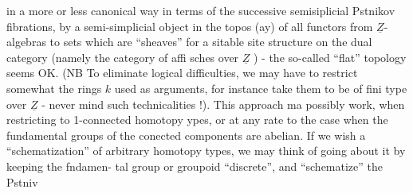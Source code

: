 in a more or less canonical way in terms of the successive semisiplicial
Pstnikov fibrations, by a semi-simplicial object in the topos (ay) of
all functors from $\underline{Z}$-algebras to sets which are ``sheaves'' for a sitable
site structure on the dual category (namely the category of affi
sches over $\underline{Z}$ ) - the so-called ``flat'' topology seems  OK. (NB To
eliminate logical difficulties, we may have to restrict somewhat the
rings $k$ used as arguments, for instance take them to be of fini type
over $\underline{Z}$ - never mind such technicalities !). This approach  ma
possibly work, when restricting to  1-connected homotopy ypes,
or at any rate to the case when the fundamental groups of the conected
\margin{*} components are abelian. If we wish a ``schematization'' of arbitrary
homotopy types, we may think of going about it by keeping the fndamen-%
tal group or groupoid ``discrete'', and ``schematize'' the Pstniv

